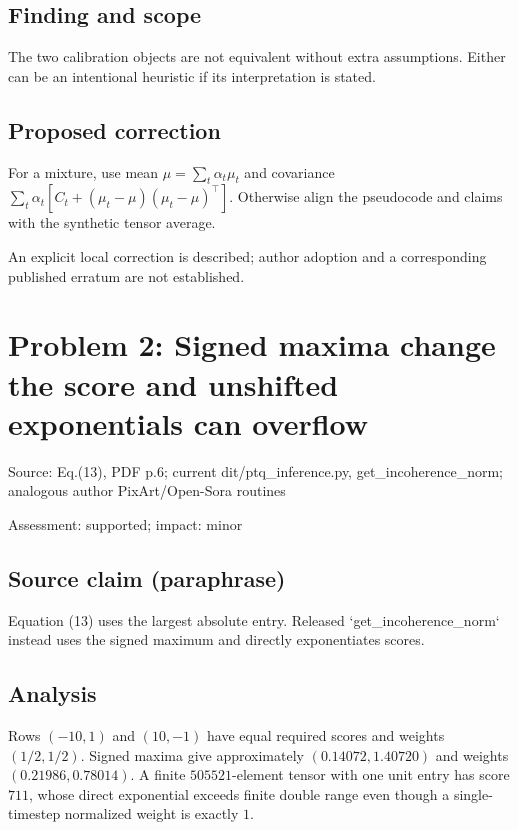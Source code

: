 \documentclass[11pt]{article}
\begin{document}
\subsection*{Finding and scope}

The two calibration objects are not equivalent without extra assumptions. Either can be an intentional heuristic if its interpretation is stated.

\subsection*{Proposed correction}

For a mixture, use mean \(\mu=\sum_t\alpha_t\mu_t\) and covariance \(\sum_t\alpha_t[C_t+(\mu_t-\mu)(\mu_t-\mu)^\top]\). Otherwise align the pseudocode and claims with the synthetic tensor average.

An explicit local correction is described; author adoption and a corresponding published erratum are not established.

\section*{Problem 2: Signed maxima change the score and unshifted exponentials can overflow}

Source: Eq.(13), PDF p.6; current dit/ptq\_inference.py, get\_incoherence\_norm; analogous author PixArt/Open-Sora routines

Assessment: supported; impact: minor

\subsection*{Source claim (paraphrase)}

Equation (13) uses the largest absolute entry. Released `get\_incoherence\_norm` instead uses the signed maximum and directly exponentiates scores.

\subsection*{Analysis}

Rows \((-10,1)\) and \((10,-1)\) have equal required scores and weights \((1/2,1/2)\). Signed maxima give approximately \((0.14072,1.40720)\) and weights \((0.21986,0.78014)\). A finite \(505521\)-element tensor with one unit entry has score \(711\), whose direct exponential exceeds finite double range even though a single-timestep normalized weight is exactly \(1\).
\end{document}
